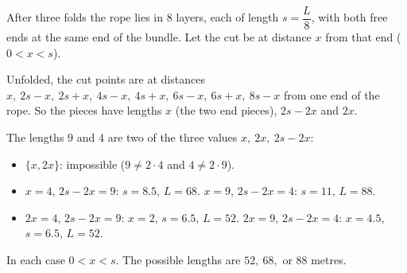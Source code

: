 After three folds the rope lies in $8$ layers, each of length $s=\dfrac L8$, with both free ends at the same end of the bundle. Let the cut be at distance $x$ from that end ($0<x<s$).

Unfolded, the cut points are at distances $x,\ 2s-x,\ 2s+x,\ 4s-x,\ 4s+x,\ 6s-x,\ 6s+x,\ 8s-x$ from one end of the rope. So the pieces have lengths $x$ (the two end pieces), $2s-2x$ and $2x$.

The lengths $9$ and $4$ are two of the three values $x,\ 2x,\ 2s-2x$:
\begin{itemize}
\item $\{x,2x\}$: impossible ($9\ne2\cdot4$ and $4\ne2\cdot9$).
\item $x=4$, $2s-2x=9$: $s=8.5$, $L=68$. \quad $x=9$, $2s-2x=4$: $s=11$, $L=88$.
\item $2x=4$, $2s-2x=9$: $x=2$, $s=6.5$, $L=52$. \quad $2x=9$, $2s-2x=4$: $x=4.5$, $s=6.5$, $L=52$.
\end{itemize}
In each case $0<x<s$. The possible lengths are $\boxed{52,\ 68,\text{ or }88}$ metres.
